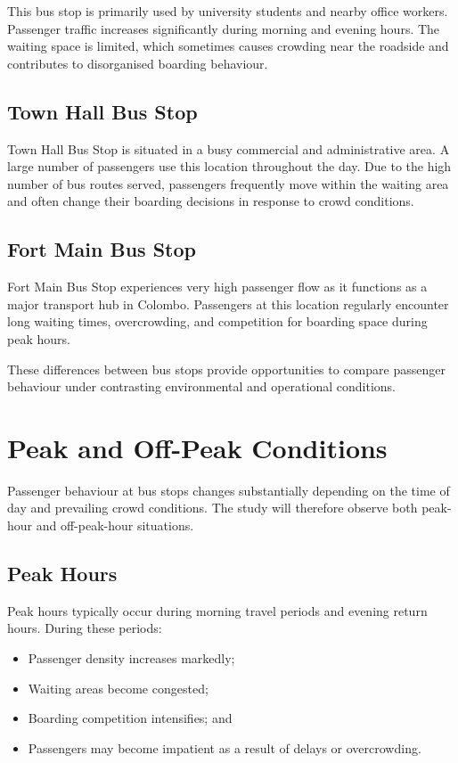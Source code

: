 \documentclass[12pt, a4paper]{report}
\begin{document}
This bus stop is primarily used by university students and nearby office workers. Passenger
traffic increases significantly during morning and evening hours. The waiting space is
limited, which sometimes causes crowding near the roadside and contributes to disorganised
boarding behaviour.

\subsection{Town Hall Bus Stop}

Town Hall Bus Stop is situated in a busy commercial and administrative area. A large number
of passengers use this location throughout the day. Due to the high number of bus routes
served, passengers frequently move within the waiting area and often change their boarding
decisions in response to crowd conditions.

\subsection{Fort Main Bus Stop}

Fort Main Bus Stop experiences very high passenger flow as it functions as a major transport
hub in Colombo. Passengers at this location regularly encounter long waiting times,
overcrowding, and competition for boarding space during peak hours.

These differences between bus stops provide opportunities to compare passenger behaviour
under contrasting environmental and operational conditions.

\section{Peak and Off-Peak Conditions}

Passenger behaviour at bus stops changes substantially depending on the time of day and
prevailing crowd conditions. The study will therefore observe both peak-hour and
off-peak-hour situations.

\subsection{Peak Hours}

Peak hours typically occur during morning travel periods and evening return hours. During
these periods:

\begin{itemize}[noitemsep]
    \item Passenger density increases markedly;
    \item Waiting areas become congested;
    \item Boarding competition intensifies; and
    \item Passengers may become impatient as a result of delays or overcrowding.
\end{itemize}
\end{document}
